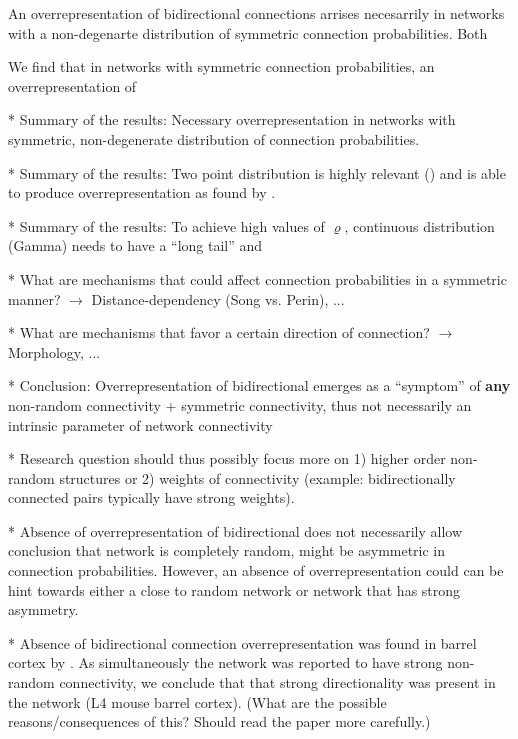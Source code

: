
An overrepresentation of bidirectional connections arrises necesarrily in networks with a non-degenarte distribution of symmetric connection probabilities. Both  


We find that in networks with symmetric connection probabilities, an overrepresentation of 

* Summary of the results: Necessary overrepresentation in networks with symmetric, non-degenerate distribution of connection probabilities.

* Summary of the results: Two point distribution is highly relevant (\cite{Lee2016}) and is able to produce overrepresentation as found by \cite{Song2005}.

* Summary of the results: To achieve high values of $\varrho$, continuous distribution (Gamma) needs to have a \enquote{long tail} and 

* What are mechanisms that could affect connection probabilities in a symmetric manner? $\rightarrow$ Distance-dependency (Song vs. Perin), ...

* What are mechanisms that favor a certain direction of connection? $\rightarrow$ Morphology, ...

* Conclusion: Overrepresentation of bidirectional emerges as a \enquote{symptom} of \textbf{any} non-random connectivity $+$ symmetric connectivity, thus not necessarily an intrinsic parameter of network connectivity

* Research question should thus possibly focus more on 1) higher order non-random structures or 2) weights of connectivity (example: bidirectionally connected pairs typically have strong weights). 

* Absence of overrepresentation of bidirectional does not necessarily allow conclusion that network is completely random, might be asymmetric in connection probabilities. However, an absence of overrepresentation could can be hint towards either a close to random network or network that has strong asymmetry.

* Absence of bidirectional connection overrepresentation was found in barrel cortex by \cite{Lefort2009}. As simultaneously the network was reported to have strong non-random connectivity, we conclude that that strong directionality was present in the network (L4 mouse barrel cortex). (What are the possible reasons/consequences of this? Should read the paper more carefully.)

